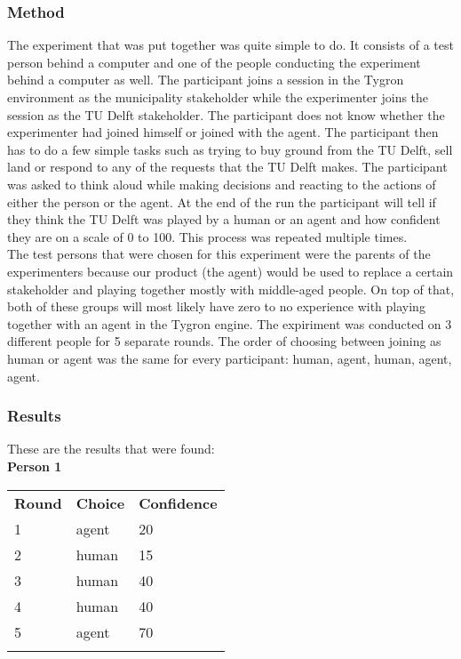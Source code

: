 \subsubsection{Method}
The experiment that was put together was quite simple to do. It consists of a test person behind a computer and one of the people conducting the experiment behind a computer as well. The participant joins a session in the Tygron environment as the municipality stakeholder while the experimenter joins the session as the TU Delft stakeholder. The participant does not know whether the experimenter had joined himself or joined with the agent. The participant then has to do a few simple tasks such as trying to buy ground from the TU Delft, sell land or respond to any of the requests that the TU Delft makes. The participant was asked to think aloud while making decisions and reacting to the actions of either the person or the agent. At the end of the run the participant will tell if they think the TU Delft was played by a human or an agent and how confident they are on a scale of 0 to 100. This process was repeated multiple times. \\

The test persons that were chosen for this experiment were the parents of the experimenters because our product (the agent) would be used to replace a certain stakeholder and playing together mostly with middle-aged people. On top of that, both of these groups will most likely have zero to no experience with playing together with an agent in the Tygron engine. The expiriment was conducted on 3 different people for 5 separate rounds. The order of choosing between joining as human or agent was the same for every participant: human, agent, human, agent, agent.

\subsubsection{Results}
These are the results that were found: \\

\textbf{Person 1}
\begin{tabular}{lll}
\textbf{Round} & \textbf{Choice}  & \textbf{Confidence}\\ 
1 & agent  & 20         \\
2 & human  & 15         \\
3 & human  & 40         \\
4 & human  & 40         \\
5 & agent  & 70        \\\\
\end{tabular}

